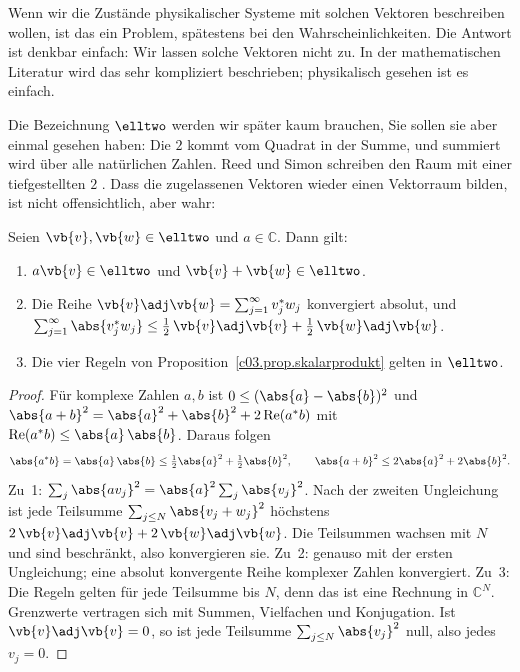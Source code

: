 \begin{vertiefung}
  Wenn wir die Zustände physikalischer Systeme mit solchen Vektoren beschreiben wollen, ist
  das ein Problem, spätestens bei den Wahrscheinlichkeiten. Die Antwort ist denkbar
  einfach: Wir lassen solche Vektoren nicht zu. In der mathematischen Literatur wird das
  sehr kompliziert beschrieben; physikalisch gesehen ist es einfach.


  Die Bezeichnung $\elltwo$ werden wir später kaum brauchen, Sie sollen sie aber einmal
  gesehen haben: Die $2$ kommt vom Quadrat in der Summe, und summiert wird über alle
  natürlichen Zahlen. Reed und Simon schreiben den Raum mit einer tiefgestellten $2$
  . Dass die zugelassenen Vektoren wieder einen Vektorraum
  bilden, ist nicht offensichtlich, aber wahr:

  \begin{proposition}\label{c03.prop.elltwo}
    Seien $\vb{v}, \vb{w} \in \elltwo$ und $a \in \mathbb{C}$. Dann gilt:
    \begin{enumerate}
      \item $a\vb{v} \in \elltwo$ und $\vb{v} + \vb{w} \in \elltwo$.
      \item Die Reihe $\vb{v}\adj\vb{w} = \sum_{j=1}^{\infty} v_j^* w_j$ konvergiert absolut,
        und $\sum_{j=1}^{\infty} \abs{v_j^* w_j} \leq \tfrac12\, \vb{v}\adj\vb{v} + \tfrac12\, \vb{w}\adj\vb{w}$.
      \item Die vier Regeln von Proposition~\ref{c03.prop.skalarprodukt} gelten in $\elltwo$.
    \end{enumerate}
  \end{proposition}
  \begin{proof}
    Für komplexe Zahlen $a, b$ ist $0 \leq (\abs{a} - \abs{b})^2$ und
    $\abs{a + b}^2 = \abs{a}^2 + \abs{b}^2 + 2 \operatorname{Re}(a^* b)$ mit
    $\operatorname{Re}(a^* b) \leq \abs{a}\,\abs{b}$. Daraus folgen
    \begin{equation}\label{c03.eq.ab}
      \abs{a^* b} = \abs{a}\,\abs{b} \leq \tfrac12 \abs{a}^2 + \tfrac12 \abs{b}^2,
      \qquad
      \abs{a + b}^2 \leq 2\abs{a}^2 + 2\abs{b}^2 .
    \end{equation}
    Zu~1: $\sum_{j} \abs{a v_j}^2 = \abs{a}^2 \sum_j \abs{v_j}^2$. Nach der zweiten
    Ungleichung ist jede Teilsumme $\sum_{j \leq N} \abs{v_j + w_j}^2$ höchstens
    $2\, \vb{v}\adj\vb{v} + 2\, \vb{w}\adj\vb{w}$. Die Teilsummen wachsen mit $N$ und sind
    beschränkt, also konvergieren sie. Zu~2: genauso mit der ersten Ungleichung; eine absolut
    konvergente Reihe komplexer Zahlen konvergiert. Zu~3: Die Regeln gelten für jede
    Teilsumme bis $N$, denn das ist eine Rechnung in $\mathbb{C}^N$. Grenzwerte vertragen
    sich mit Summen, Vielfachen und Konjugation. Ist $\vb{v}\adj\vb{v} = 0$, so ist jede
    Teilsumme $\sum_{j \leq N} \abs{v_j}^2$ null, also jedes $v_j = 0$.
  \end{proof}


\end{vertiefung}
